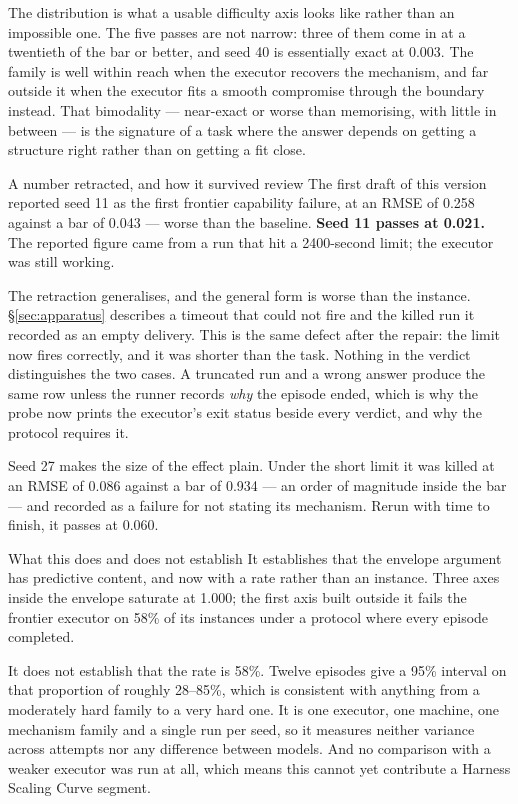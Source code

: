 \documentclass[11pt]{article}
\theoremstyle{definition}
\begin{document}
The distribution is what a usable difficulty axis looks like rather than an impossible one. The five passes are not narrow: three of them come in at a twentieth of the bar or better, and seed 40 is essentially exact at 0.003. The family is well within reach when the executor recovers the mechanism, and far outside it when the executor fits a smooth compromise through the boundary instead. That bimodality --- near-exact or worse than memorising, with little in between --- is the signature of a task where the answer depends on getting a structure right rather than on getting a fit close.

\begin{cautionbox}{A number retracted, and how it survived review}
The first draft of this version reported seed 11 as the first frontier capability failure, at an RMSE of 0.258 against a bar of 0.043 --- worse than the baseline. \textbf{Seed 11 passes at 0.021.} The reported figure came from a run that hit a 2400-second limit; the executor was still working.

The retraction generalises, and the general form is worse than the instance. \S\ref{sec:apparatus} describes a timeout that could not fire and the killed run it recorded as an empty delivery. This is the same defect after the repair: the limit now fires correctly, and it was shorter than the task. Nothing in the verdict distinguishes the two cases. A truncated run and a wrong answer produce the same row unless the runner records \emph{why} the episode ended, which is why the probe now prints the executor's exit status beside every verdict, and why the protocol requires it.

Seed 27 makes the size of the effect plain. Under the short limit it was killed at an RMSE of 0.086 against a bar of 0.934 --- an order of magnitude inside the bar --- and recorded as a failure for not stating its mechanism. Rerun with time to finish, it passes at 0.060.
\end{cautionbox}

\begin{claimbox}{What this does and does not establish}
It establishes that the envelope argument has predictive content, and now with a rate rather than an instance. Three axes inside the envelope saturate at 1.000; the first axis built outside it fails the frontier executor on 58\% of its instances under a protocol where every episode completed.

It does not establish that the rate is 58\%. Twelve episodes give a 95\% interval on that proportion of roughly 28--85\%, which is consistent with anything from a moderately hard family to a very hard one. It is one executor, one machine, one mechanism family and a single run per seed, so it measures neither variance across attempts nor any difference between models. And no comparison with a weaker executor was run at all, which means this cannot yet contribute a Harness Scaling Curve segment.
\end{claimbox}
\end{document}
